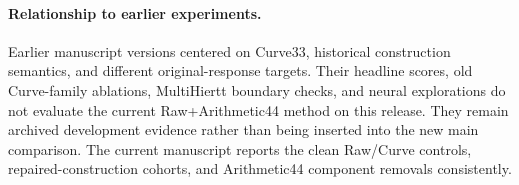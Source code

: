 \paragraph{Relationship to earlier experiments.}
Earlier manuscript versions centered on Curve33, historical construction semantics, and different original-response targets. Their headline scores, old Curve-family ablations, MultiHiertt boundary checks, and neural explorations do not evaluate the current Raw+Arithmetic44 method on this release. They remain archived development evidence rather than being inserted into the new main comparison. The current manuscript reports the clean Raw/Curve controls, repaired-construction cohorts, and Arithmetic44 component removals consistently.


